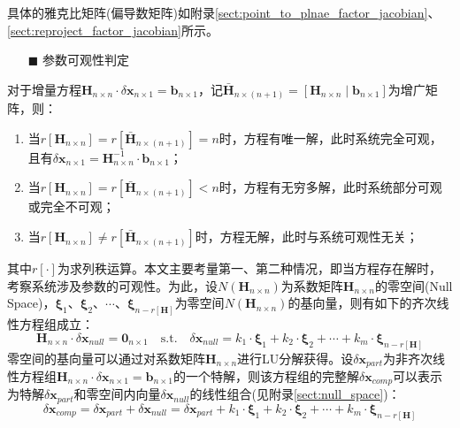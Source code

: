 具体的雅克比矩阵(偏导数矩阵)如附录\ref{sect:point_to_plnae_factor_jacobian}、\ref{sect:reproject_factor_jacobian}所示。

\begin{itemize}
  \item[$\blacksquare$]参数可观性判定
\end{itemize}

对于增量方程$\boldsymbol{H}_{n\times n}\cdot\delta\boldsymbol{x}_{n\times 1}=\boldsymbol{b}_{n\times 1}$，记$\bar{\boldsymbol{H}}_{n\times (n+1)}=\left[\boldsymbol{H}_{n\times n}\mid \boldsymbol{b}_{n\times 1}\right]$为增广矩阵，则：
\begin{enumerate}
  \item 当$r[\boldsymbol{H}_{n\times n}]=r[\bar{\boldsymbol{H}}_{n\times (n+1)}]=n$时，方程有唯一解，此时系统完全可观，且有$\delta\boldsymbol{x}_{n\times 1}=\boldsymbol{H}^{-1}_{n\times n}\cdot\boldsymbol{b}_{n\times 1}$；

  \item 当$r[\boldsymbol{H}_{n\times n}]=r[\bar{\boldsymbol{H}}_{n\times (n+1)}]<n$时，方程有无穷多解，此时系统部分可观或完全不可观；

  \item 当$r[\boldsymbol{H}_{n\times n}]\ne r[\bar{\boldsymbol{H}}_{n\times (n+1)}]$时，方程无解，此时与系统可观性无关；
\end{enumerate}
其中$r[\cdot]$为求列秩运算。本文主要考量第一、第二种情况，即当方程存在解时，考察系统涉及参数的可观性。为此，设$N(\boldsymbol{H}_{n\times n})$为系数矩阵$\boldsymbol{H}_{n\times n}$的零空间(Null Space)，$\boldsymbol{\xi}_1$、$\boldsymbol{\xi}_2$、$\cdots$、$\boldsymbol{\xi}_{n-r[\boldsymbol{H}]}$为零空间$N(\boldsymbol{H}_{n\times n})$的基向量，则有如下的齐次线性方程组成立：
\begin{equation}
  \boldsymbol{H}_{n\times n}\cdot\delta\boldsymbol{x}_{null}=\boldsymbol{0}_{n\times 1}\quad\mathrm{s.t.}\quad \delta\boldsymbol{x}_{null}=k_1\cdot\boldsymbol{\xi}_1+k_2\cdot\boldsymbol{\xi}_2+\cdots+k_m\cdot\boldsymbol{\xi}_{n-r[\boldsymbol{H}]}
\end{equation}
零空间的基向量可以通过对系数矩阵$\boldsymbol{H}_{n\times n}$进行LU分解获得。设$\delta\boldsymbol{x}_{part}$为非齐次线性方程组$\boldsymbol{H}_{n\times n}\cdot\delta\boldsymbol{x}_{n\times 1}=\boldsymbol{b}_{n\times 1}$的一个特解，则该方程组的完整解$\delta\boldsymbol{x}_{comp}$可以表示为特解$\delta\boldsymbol{x}_{part}$和零空间内向量$\delta\boldsymbol{x}_{null}$的线性组合(见附录\ref{sect:null_space})：
\begin{equation}
  \delta\boldsymbol{x}_{comp}=\delta\boldsymbol{x}_{part}+\delta\boldsymbol{x}_{null}=\delta\boldsymbol{x}_{part}+k_1\cdot\boldsymbol{\xi}_1+k_2\cdot\boldsymbol{\xi}_2+\cdots+k_m\cdot\boldsymbol{\xi}_{n-r[\boldsymbol{H}]}
\end{equation}

